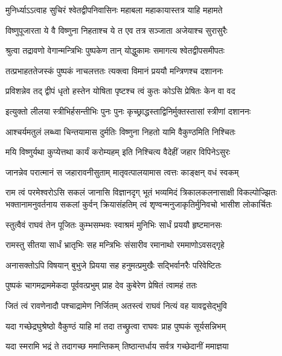 \twolineshloka
{मुनिर्ध्याऽऽत्वाह सुचिरं श्वेतद्वीपनिवासिनः}
{महाबला महाकायास्तत्र याहि महामते} %

\twolineshloka
{विष्णुपूजारता ये वै विष्णुना निहताश्च ये}
{त एव तत्र सञ्जाता अजेयाश्च सुरासुरैः} %

\twolineshloka
{श्रुत्वा तद्रावणो वेगान्मन्त्रिभिः पुष्पकेण तान्}
{योद्धुकामः समागत्य श्वेतद्वीपसमीपतः} %

\twolineshloka
{तत्प्रभाहततेजस्कं पुष्पकं नाचलत्ततः}
{त्यक्त्वा विमानं प्रययौ मन्त्रिणश्च दशाननः} %

\twolineshloka
{प्रविशन्नेव तद् द्वीपं धृतो हस्तेन योषिता}
{पृष्टश्च त्वं कुतः कोऽसि प्रेषितः केन वा वद} %

\twolineshloka
{इत्युक्तो लीलया स्त्रीभिर्हसन्तीभिः पुनः पुनः}
{कृच्छ्राद्धस्ताद्विनिर्मुक्तस्तासां स्त्रीणां दशाननः} %

\twolineshloka
{आश्चर्यमतुलं लब्ध्वा चिन्तयामास दुर्मतिः}
{विष्णुना निहतो यामि वैकुण्ठमिति निश्चितः} %

\twolineshloka
{मयि विष्णुर्यथा कुप्येत्तथा कार्यं करोम्यहम्}
{इति निश्चित्य वैदेहीं जहार विपिनेऽसुरः} %

\twolineshloka
{जानन्नेव परात्मानं स जहारावनीसुताम्}
{मातृवत्पालयामास त्वत्तः काङ्क्षन् वधं स्वकम्} %

\fourlineindentedshloka
{राम त्वं परमेश्वरोऽसि सकलं जानासि विज्ञानदृग्}
{भूतं भव्यमिदं त्रिकालकलनासाक्षी विकल्पोज्झितः}
{भक्तानामनुवर्तनाय सकलां कुर्वन् क्रियासंहतिम्}
{त्वं शृण्वन्मनुजाकृतिर्मुनिवचो भासीश लोकार्चितः} %

\twolineshloka
{स्तुत्वैवं राघवं तेन पूजितः कुम्भसम्भवः}
{स्वाश्रमं मुनिभिः सार्धं प्रययौ हृष्टमानसः} %

\twolineshloka
{रामस्तु सीतया सार्धं भ्रातृभिः सह मन्त्रिभिः}
{संसारीव रमानाथो रममाणोऽवसद्गृहे} %

\twolineshloka
{अनासक्तोऽपि विषयान् बुभुजे प्रियया सह}
{हनुमत्प्रमुखैः सद्भिर्वानरैः परिवेष्टितः} %

\twolineshloka
{पुष्पकं चागमद्राममेकदा पूर्ववत्प्रभुम्}
{प्राह देव कुबेरेण प्रेषितं त्वामहं ततः} %

\twolineshloka
{जितं त्वं रावणेनादौ पश्चाद्रामेण निर्जितम्}
{अतस्त्वं राघवं नित्यं वह यावद्वसेद्भुवि} %

\twolineshloka
{यदा गच्छेद्रघुश्रेष्ठो वैकुण्ठं याहि मां तदा}
{तच्छ्रुत्वा राघवः प्राह पुष्पकं सूर्यसन्निभम्} %

\twolineshloka
{यदा स्मरामि भद्रं ते तदागच्छ ममान्तिकम्}
{तिष्ठान्तर्धाय सर्वत्र गच्छेदानीं ममाज्ञया} %

